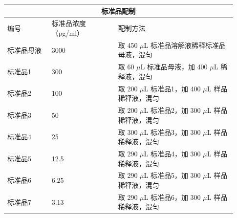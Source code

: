 \documentclass[UTF8,10pt,a4paper,fontset=fandol]{ctexart}
\newcommand{\fieldvalue}[1]{#1}
\newcommand{\handwritten}[1]{#1}
\begin{document}
\begin{center}
\begin{tabular}{|p{0.18\linewidth}|p{0.27\linewidth}|p{0.48\linewidth}|}
\hline
\multicolumn{3}{|c|}{标准品配制}\\
\hline
编号 & 标准品浓度（pg/ml） & 配制方法\\
\hline
标准品母液 & 3000 &
取
\fieldvalue{\handwritten{450}}
$\mu$L 标准品溶解液稀释标准品母液，混匀\\
\hline
标准品1 & 300 &
取
\fieldvalue{\handwritten{60}}
$\mu$L 标准品母液，加
\fieldvalue{\handwritten{400}}
$\mu$L 稀释液，混匀\\
\hline
标准品2 & 100 &
取
\fieldvalue{\handwritten{200}}
$\mu$L 标准品1，加
\fieldvalue{\handwritten{400}}
$\mu$L 样品稀释液，混匀\\
\hline
标准品3 & 50 &
取
\fieldvalue{\handwritten{200}}
$\mu$L 标准品2，加
\fieldvalue{\handwritten{300}}
$\mu$L 样品稀释液，混匀\\
\hline
标准品4 & 25 &
取
\fieldvalue{\handwritten{300}}
$\mu$L 标准品3，加
\fieldvalue{\handwritten{300}}
$\mu$L 样品稀释液，混匀\\
\hline
标准品5 & 12.5 &
取
\fieldvalue{\handwritten{290}}
$\mu$L 标准品4，加
\fieldvalue{\handwritten{300}}
$\mu$L 样品稀释液，混匀\\
\hline
标准品6 & 6.25 &
取
\fieldvalue{\handwritten{290}}
$\mu$L 标准品5，加
\fieldvalue{\handwritten{300}}
$\mu$L 样品稀释液，混匀\\
\hline
标准品7 & 3.13 &
取
\fieldvalue{\handwritten{290}}
$\mu$L 标准品6，加
\fieldvalue{\handwritten{300}}
$\mu$L 样品稀释液，混匀\\
\hline
\end{tabular}
\end{center}
\end{document}
